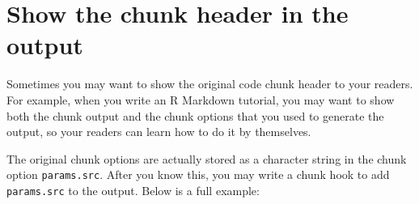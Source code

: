 \documentclass[
  11pt,
]{krantz}
\begin{document}
\hypertarget{show-header}{%
\section{Show the chunk header in the output}\label{show-header}}

Sometimes you may want to show the original code chunk header to your readers. For example, when you write an R Markdown tutorial, you may want to show both the chunk output and the chunk options that you used to generate the output, so your readers can learn how to do it by themselves.

The original chunk options are actually stored as a character string in the chunk option \texttt{params.src}. After you know this, you may write a chunk hook to add \texttt{params.src} to the output. Below is a full example:
\end{document}
